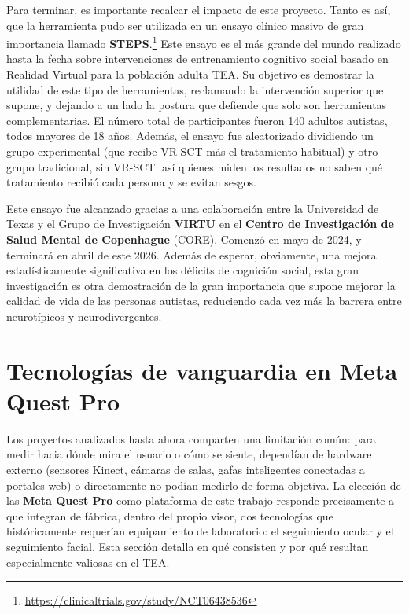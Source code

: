 \documentclass[12pt,twoside,titlepage]{report}
\begin{document}
\begin{enumerate}[label=\textbf{\arabic*.}, leftmargin=1.5cm, itemsep=0.5em]
    Para terminar, es importante recalcar el impacto de este proyecto.
Tanto es así, que la herramienta pudo ser utilizada en un ensayo clínico masivo de gran importancia llamado \textbf{STEPS}.\footnote{\url{https://clinicaltrials.gov/study/NCT06438536}} Este ensayo es el más grande del mundo realizado hasta la fecha sobre intervenciones de entrenamiento cognitivo social basado en Realidad Virtual para la población adulta TEA.
Su objetivo es demostrar la utilidad de este tipo de herramientas, reclamando la intervención superior que supone, y dejando a un lado la postura que defiende que solo son herramientas complementarias.
El número total de participantes fueron 140 adultos autistas, todos mayores de 18 años.
Además, el ensayo fue aleatorizado dividiendo un grupo experimental (que recibe VR-SCT más el tratamiento habitual) y otro grupo tradicional, sin VR-SCT: así quienes miden los resultados no saben qué tratamiento recibió cada persona y se evitan sesgos.

    Este ensayo fue alcanzado gracias a una colaboración entre la Universidad de Texas y el Grupo de Investigación \textbf{VIRTU} en el \textbf{Centro de Investigación de Salud Mental de Copenhague} (CORE).
Comenzó en mayo de 2024, y terminará en abril de este 2026.
Además de esperar, obviamente, una mejora estadísticamente significativa en los déficits de cognición social, esta gran investigación es otra demostración de la gran importancia que supone mejorar la calidad de vida de las personas autistas, reduciendo cada vez más la barrera entre neurotípicos y neurodivergentes.
\end{enumerate}


\section{Tecnologías de vanguardia en Meta Quest Pro}

Los proyectos analizados hasta ahora comparten una limitación común: para medir hacia dónde mira el usuario o cómo se siente, dependían de hardware externo (sensores Kinect, cámaras de salas, gafas inteligentes conectadas a portales web) o directamente no podían medirlo de forma objetiva.
La elección de las \textbf{Meta Quest Pro} como plataforma de este trabajo responde precisamente a que integran de fábrica, dentro del propio visor, dos tecnologías que históricamente requerían equipamiento de laboratorio: el seguimiento ocular y el seguimiento facial.
Esta sección detalla en qué consisten y por qué resultan especialmente valiosas en el TEA.
\end{document}
